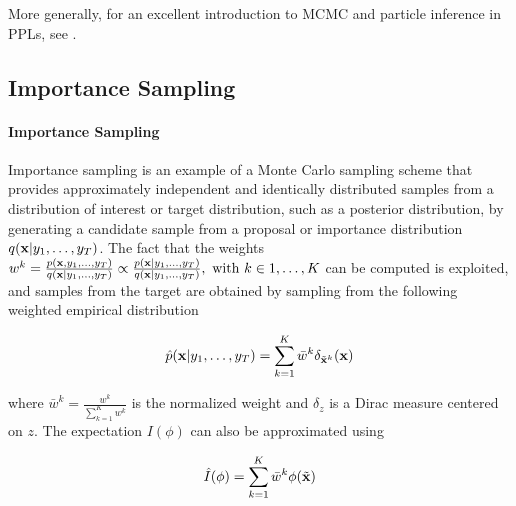 More generally, for an excellent introduction to \gls{MCMC} and particle inference in \glspl{PPL}, see \cite{dippl}.


\subsection{Importance Sampling} \label{IS}

\paragraph{Importance Sampling}
Importance sampling is an example of a Monte Carlo sampling scheme that provides approximately independent and identically distributed samples from a distribution of interest or target distribution, such as a posterior distribution, by generating a candidate sample from a proposal or importance distribution $q(\boldsymbol{\mathbf{x}}|y_1,\dots,y_T)$.
The fact that the weights 
$w^k = \frac{p(\boldsymbol{\mathbf{x}}, y_1,\dots,y_T)}{q(\boldsymbol{\mathbf{x}}|y_1,\dots,y_T)} \propto \frac{p(\boldsymbol{\mathbf{x}}|y_1,\dots,y_T)}{q(\boldsymbol{\mathbf{x}}|y_1,\dots,y_T)}, \ \text{with} \ k \in 1,\dots,K$ can be computed is exploited, and samples from the target are obtained by sampling from the following weighted empirical distribution

$$ \hat{p}(\boldsymbol{\mathbf{x}}|y_1,\dots,y_T) = \sum_{k=1}^K \bar{w}^k \delta_{\tilde{\boldsymbol{\mathbf{x}}}^k} (\boldsymbol{\mathbf{x}})$$

where $\bar{w}^k = \frac{{w}^k}{\sum_{k=1}^K {w}^k}$ is the normalized weight and
$\delta_{z}$ is a Dirac measure centered on $z$.
The expectation $I(\phi)$ can also be approximated using

$$ \hat{I}(\phi) = \sum_{k=1}^K \bar{w}^k \phi(\tilde{\boldsymbol{\mathbf{x}}})$$


